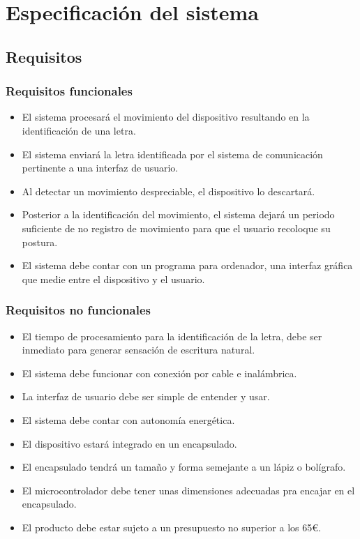\chapter{Especificación del sistema}

\section{Requisitos}
\subsection{Requisitos funcionales\label{reqF}}
\begin{itemize}
    \itemsep0em 
    \item El sistema procesará el movimiento del dispositivo resultando en la
    identificación de una letra.
    \item El sistema enviará la letra identificada por el sistema
    de comunicación pertinente a una interfaz de usuario.
    \item Al detectar un movimiento despreciable, el dispositivo lo descartará.
    \item Posterior a la identificación del movimiento, el sistema
    dejará un periodo suficiente de no registro de movimiento para
    que el usuario recoloque su postura.
    \item El sistema debe contar con un programa para ordenador, una interfaz
    gráfica que medie entre el dispositivo y el usuario.
\end{itemize}


\subsection{Requisitos no funcionales\label{reqNF}}
\begin{itemize}
    \itemsep0em
    \item El tiempo de procesamiento para la identificación de la letra,
    debe ser inmediato para generar sensación de escritura natural.
    \item El sistema debe funcionar con conexión por cable e inalámbrica.
    \item La interfaz de usuario debe ser simple de entender y usar.
    \item El sistema debe contar con autonomía energética.
    \item El dispositivo estará integrado en un encapsulado.
    \item El encapsulado tendrá un tamaño y forma semejante a un lápiz o bolígrafo.
    \item El microcontrolador debe tener unas dimensiones adecuadas pra encajar
    en el encapsulado.
    \item El producto debe estar sujeto a un presupuesto no superior a los 65€.
\end{itemize}

